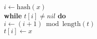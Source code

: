 \documentclass{beamer}
\begin{document}
\begin{frame}
\begin{oframed}
\begin{flushleft}
\hspace*{1em} \hspace*{1em} \hspace*{1em} \hspace*{1em} \ensuremath{i \gets  \ensuremath{\mathrm{hash}(x)}}\\
\hspace*{1em} \hspace*{1em} \hspace*{1em} \hspace*{1em} {\color{black} \textbf{while}} \ensuremath{t[i] \ne nil} {\color{black} \textbf{do}}  \\
\hspace*{1em} \hspace*{1em} \hspace*{1em} \hspace*{1em} \hspace*{1em} \ensuremath{i \gets  \ensuremath{(i+1) \bmod  \mathrm{length}(t)}}\\
\hspace*{1em} \hspace*{1em} \hspace*{1em} \hspace*{1em} \ensuremath{t[i] \gets  x}\\
\end{flushleft}
\end{oframed}


\end{frame}
\end{document}
